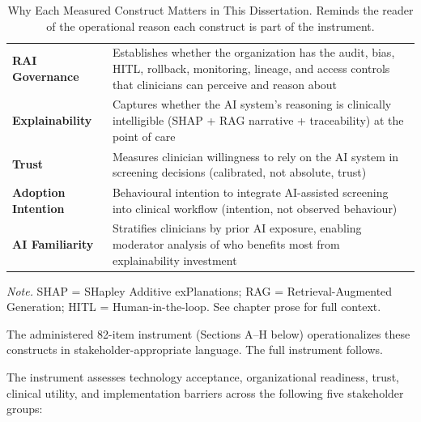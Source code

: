 {\tablestripes\tablefontsize
{}
\begin{xltabular}{\textwidth}{@{} >{\raggedright\arraybackslash}p{3.0cm} L @{}}
\caption[Why Each Construct Matters]{Why Each Measured Construct Matters in This Dissertation. Reminds the reader of the operational reason each construct is part of the instrument.}\label{tab:survey_construct_purpose} \\
\toprule
{} &  \\
\midrule
\endfirsthead
\endhead
\bottomrule
\endlastfoot
\textbf{RAI Governance}       & Establishes whether the organization has the audit, bias, HITL, rollback, monitoring, lineage, and access controls that clinicians can perceive and reason about \\
\textbf{Explainability}       & Captures whether the AI system's reasoning is clinically intelligible (SHAP + RAG narrative + traceability) at the point of care \\
\textbf{Trust}                & Measures clinician willingness to rely on the AI system in screening decisions (calibrated, not absolute, trust) \\
\textbf{Adoption Intention}   & Behavioural intention to integrate AI-assisted screening into clinical workflow (intention, not observed behaviour) \\
\textbf{AI Familiarity}       & Stratifies clinicians by prior AI exposure, enabling moderator analysis of who benefits most from explainability investment \\
\end{xltabular}}
\vspace{0.3em}\noindent\textit{Note.} SHAP = SHapley Additive exPlanations; RAG = Retrieval-Augmented Generation; HITL = Human-in-the-loop. See chapter prose for full context.

\noindent The administered 82-item instrument (Sections A--H below) operationalizes these constructs in stakeholder-appropriate language. The full instrument follows.

The instrument assesses technology acceptance, organizational readiness, trust, clinical utility, and implementation barriers across the following five stakeholder groups:


